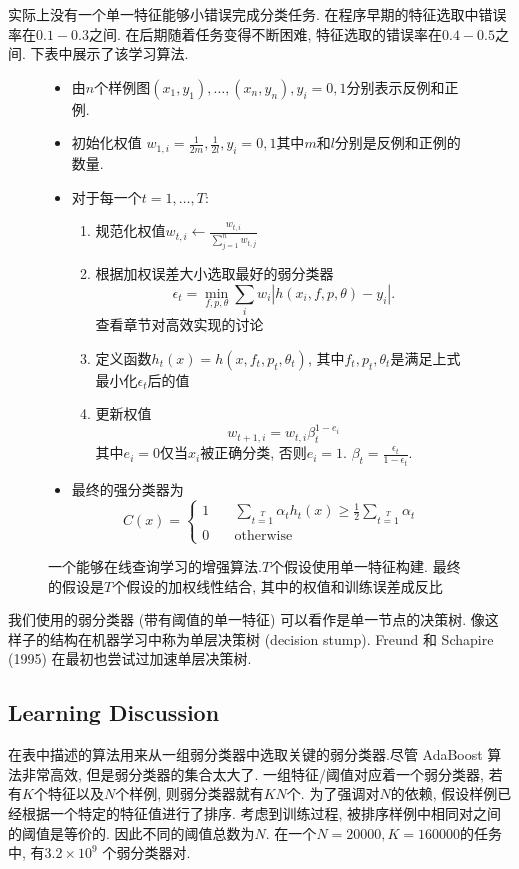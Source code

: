 \documentclass[utf8]{ctexart}
\begin{document}
实际上没有一个单一特征能够小错误完成分类任务. 在程序早期的特征选取中错误率在$0.1-0.3$之间. 在后期随着任务变得不断困难, 特征选取的错误率在$0.4-0.5$之间. 下表中展示了该学习算法.
\begin{figure}[htb]
    \caption{一个能够在线查询学习的增强算法.$T$个假设使用单一特征构建. 最终的假设是$T$个假设的加权线性结合, 其中的权值和训练误差成反比}
    \begin{itemize}
        \item 由$n$个样例图$(x_1,y_1),\ldots,(x_n,y_n), y_i=0, 1$分别表示反例和正例.
        \item 初始化权值 $w_{1,i}=\frac{1}{2m}, \frac{1}{2l},y_i=0,1$其中$m$和$l$分别是反例和正例的数量.
        \item 对于每一个$t=1,\ldots,T$:
            \begin{enumerate}
                \item 规范化权值$w_{t,i}\leftarrow \frac{w_{t,i}}{\sum_{j=1}^n w_{t,j}}$
                \item 根据加权误差大小选取最好的弱分类器
                    \[
                        \epsilon_t=\min_{f,p,\theta}\sum_i{w_i| h(x_i,f,p,\theta)-y_i |}.
                    \]
                    查看章节对高效实现的讨论
                \item 定义函数$h_t(x)=h(x,f_t,p_t,\theta_t)$, 其中$f_t,p_t,\theta_t$是满足上式最小化$\epsilon_t$后的值
                \item 更新权值
                    \[
                        w_{t+1,i}=w_{t,i}\beta_t^{1-e_i}
                    \]
                    其中$e_i=0$仅当$x_i$被正确分类, 否则$e_i=1$. $\beta_t=\frac{\epsilon_t}{1-\epsilon_t}$.
            \end{enumerate}
        \item 最终的强分类器为
            \[
                C(x)=
                \begin{cases}
                    1 &\quad\sum\limits_{t=1}\limits^T \alpha_t h_t(x)\geq \frac12\sum\limits_{t=1}\limits^T\alpha_t\\
                    0 &\quad\text{otherwise}
                \end{cases}
            \]
    \end{itemize}
\end{figure}

我们使用的弱分类器 (带有阈值的单一特征) 可以看作是单一节点的决策树. 像这样子的结构在机器学习中称为单层决策树 (decision stump). Freund 和 Schapire (1995) 在最初也尝试过加速单层决策树.
\subsection{Learning Discussion}
在表中描述的算法用来从一组弱分类器中选取关键的弱分类器.尽管 AdaBoost 算法非常高效, 但是弱分类器的集合太大了. 一组特征/阈值对应着一个弱分类器, 若有$K$个特征以及$N$个样例, 则弱分类器就有$KN$个. 为了强调对$N$的依赖, 假设样例已经根据一个特定的特征值进行了排序. 考虑到训练过程, 被排序样例中相同对之间的阈值是等价的. 因此不同的阈值总数为$N$. 在一个$N=20000, K=160000$的任务中, 有$3.2\times 10^9$ 个弱分类器对.
\end{document}

